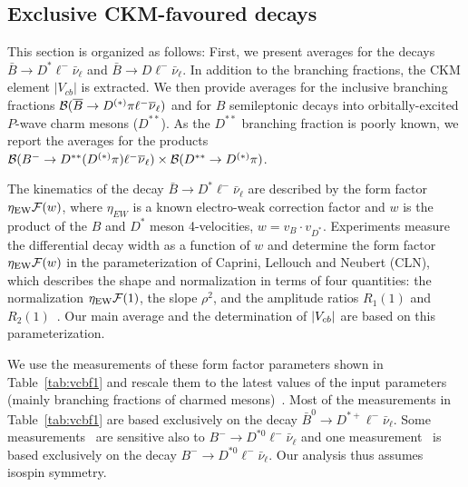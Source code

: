\subsection{Exclusive CKM-favoured decays}
\label{slbdecays_b2cexcl}
This section is organized as follows: First, we present averages for
the decays $\bar B\to D^*\ell^-\bar\nu_\ell$ and $\bar B\to
D\ell^-\bar\nu_\ell$. In addition to the branching fractions, the CKM
element $|V_{cb}|$ is extracted. We then provide
averages for the inclusive branching fractions $\cbf(\bar B\to
D^{(*)}\pi \ell^-\bar\nu_\ell)$ and for $B$ semileptonic decays into
orbitally-excited $P$-wave charm mesons ($D^{**}$). As the $D^{**}$
branching fraction is poorly known, we report the averages for the products 
$\cbf(B^-\to D^{**}(D^{(*)}\pi)\ell^-\bar\nu_\ell)\times
\cbf(D^{**}\to D^{(*)}\pi)$.


\label{slbdecays_dstarlnu}

The kinematics of the decay $\bar B\to D^*\ell^-\bar\nu_\ell$ are
described by the form factor $\eta_\mathrm{EW}{\cal F}(w)$, where
$\eta_{EW}$ is a known electro-weak correction factor and $w$ is the
product of the $B$ and $D^*$ meson 4-velocities, $w=v_B\cdot
v_{D^*}$. Experiments measure the differential decay width as a
function of $w$ and determine the form factor $\eta_\mathrm{EW}{\cal
  F}(w)$ in the parameterization of Caprini, Lellouch and Neubert
(CLN), which describes the shape and normalization in terms of four
quantities: the normalization $\eta_\mathrm{EW}{\cal F}(1)$, the slope
$\rho^2$, and the amplitude ratios $R_1(1)$ and
$R_2(1)$~\cite{CLN}. Our main average and the determination of $|V_{cb}|$
are based on this parameterization.

We use the measurements of these form factor parameters shown in
Table~\ref{tab:vcbf1} and rescale them to the latest values of the
input parameters (mainly branching fractions of charmed
mesons)~\cite{HFAG_sl:inputparams}. Most of the measurements in
Table~\ref{tab:vcbf1} are based exclusively on the decay $\bar B^0\to
D^{*+}\ell^-\bar\nu_\ell$. Some
measurements~\cite{Adam:2002uw,Aubert:2009_1} are sensitive also to
$B^-\to D^{*0}\ell^-\bar\nu_\ell$ and one
measurement~\cite{Aubert:2009_3} is based exclusively on the decay
$B^-\to D^{*0}\ell^-\bar\nu_\ell$. Our analysis thus assumes isospin
symmetry.


